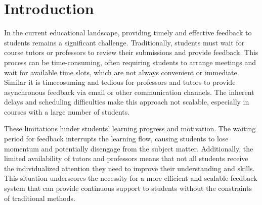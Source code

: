 \documentclass[manuscript,screen,review]{acmart}
\begin{document}



\maketitle

\section{Introduction} %


In the current educational landscape, providing timely and effective feedback to students remains a significant challenge.
Traditionally, students must wait for course tutors or professors to review their submissions and provide feedback.
This process can be time-consuming, often requiring students to arrange meetings and wait for available time slots, which are not always convenient or immediate.
Similar it is timecosuming and tedious for professors and tutors to provide asynchronous feedback via email or other communication channels.
The inherent delays and scheduling difficulties make this approach not scalable, especially in courses with a large number of students.

These limitations hinder students' learning progress and motivation.
The waiting period for feedback interrupts the learning flow, causing students to lose momentum and potentially disengage from the subject matter.
Additionally, the limited availability of tutors and professors means that not all students receive the individualized attention they need to improve their understanding and skills.
This situation underscores the necessity for a more efficient and scalable feedback system that can provide continuous support to students without the constraints of traditional methods.
\end{document}
